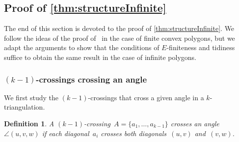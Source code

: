 \documentclass{amsart}
\newtheorem{ce}[theorem]{Counter-example}
\newtheorem{definition}[theorem]{Definition}
\theoremstyle{remark}
\newcommand{\darkblue}{\color{darkblue}} %
\newcommand{\defn}[1]{\textsl{\darkblue #1}} %
\newcommand*{\nbd}[0]{neighbourhood\xspace}
\newcommand*{\ef}[0]{E-finite\xspace}
\newcommand*{\vf}[0]{V-finite\xspace}
\newcommand*{\ktg}[0]{$k$-triangulation\xspace}
\begin{document}
%
%
%
%
%
%
%


\subsection{Proof of \cref{thm:structureInfinite}}
\label{subsec:prfInfinite}

The end of this section is devoted to the proof of \cref{thm:structureInfinite}.
We follow the ideas of the proof of~\cite{PilaudSantos-multitriangulations} in the case of finite convex polygons, but we adapt the arguments to show that the conditions of $E$-finiteness and tidiness suffice to obtain the same result in the case of infinite polygons.


\subsubsection{$(k-1)$-crossings crossing an angle}

We first study the $(k-1)$-crossings that cross a given angle in a $k$-triangulation.

\begin{definition}
A $(k-1)$-crossing~$A = \{a_1, \dots, a_{k-1}\}$ \defn{crosses} an angle~$\angle(u,v,w)$ if each diagonal~$a_i$ crosses both diagonals~$(u,v)$ and~$(v,w)$.
\end{definition}
\end{document}
